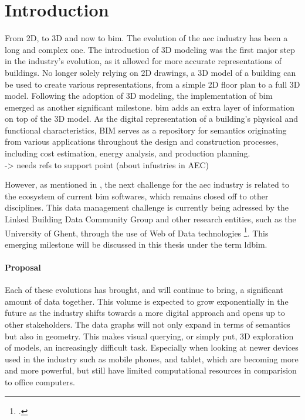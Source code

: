 \chapter{Introduction}
From 2D, to 3D and now to \acs{bim}. The evolution of the \ac{aec} industry has been a long and complex one. The introduction of 3D modeling was the first major step in the industry's evolution, as it allowed for more accurate representations of buildings. No longer solely relying on 2D drawings, a 3D model of a building can be used to create various representations, from a simple 2D floor plan to a full 3D model. Following the adoption of 3D modeling, the implementation of \ac{bim} emerged as another significant milestone. \ac{bim} adds an extra layer of information on top of the 3D model. As the digital representation of a building's physical and functional characteristics, BIM serves as a repository for semantics originating from various applications throughout the design and construction processes, including cost estimation, energy analysis, and production planning.\\
-> needs refs to support point (about infustries in AEC)

\label{sec:intro}
However, as mentioned in \cite{Werbrouck2018}, the next challenge for the \ac{aec} industry is related to the ecosystem of current \ac{bim} softwares, which remains closed off to other disciplines. This data management challenge is currently being adressed by the Linked Building Data Community Group and other research entities, such as the University of Ghent, through the use of Web of Data technologies \footcite{ldbimGroup}. This emerging milestone will be discussed in this thesis under the term \ac{ldbim}.

\subsubsection*{Proposal}
Each of these evolutions has brought, and will continue to bring, a significant amount of data together. This volume is expected to grow exponentially in the future as the industry shifts towards a more digital approach and opens up to other stakeholders. The data graphs will not only expand in terms of semantics but also in geometry. This makes visual querying, or simply put, 3D exploration of models, an increasingly difficult task. Especially when looking at newer devices used in the industry such as mobile phones, and tablet, which are becoming more and more powerful, but still have limited computational resources in comparision to office computers.

